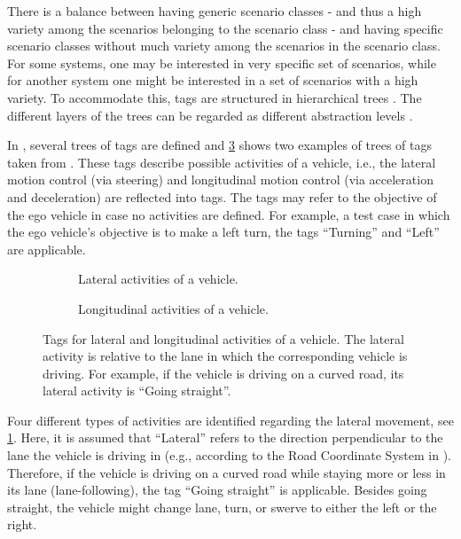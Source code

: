 There is a balance between having generic scenario classes - and thus a high variety among the scenarios belonging to the scenario class - and having specific scenario classes without much variety among the scenarios in the scenario class. For some systems, one may be interested in very specific set of scenarios, while for another system one might be interested in a set of scenarios with a high variety. To accommodate this, tags are structured in hierarchical trees \cite{molloy2017dynamic, badger2012dynamic}. The different layers of the trees can be regarded as different abstraction levels \cite{Bonnin2014}. 

In \cite{degelder2019scenarioclasses}, several trees of tags are defined and \cref{fig:tree vehicle activities} shows two examples of trees of tags taken from \cite{degelder2019scenarioclasses}. These tags describe possible activities of a vehicle, i.e., the lateral motion control (via steering) and longitudinal motion control (via acceleration and deceleration) are reflected into tags. The tags may refer to the objective of the ego vehicle in case no activities are defined. For example, a test case in which the ego vehicle's objective is to make a left turn, the tags ``Turning'' and ``Left'' are applicable. 

\begin{figure}
	\centering
	\begin{subfigure}{\linewidth}
		\centering
		\caption{Lateral activities of a vehicle.}
		\label{fig:tree vehicle lat act}
	\end{subfigure}
	\begin{subfigure}{\linewidth}
		\centering
		\caption{Longitudinal activities of a vehicle.}
		\label{fig:tree vehicle long act}
	\end{subfigure}
	\caption{Tags for lateral and longitudinal activities of a vehicle. The lateral activity is relative to the lane in which the corresponding vehicle is driving. For example, if the vehicle is driving on a curved road, its lateral activity is ``Going straight''.}
	\label{fig:tree vehicle activities}
\end{figure}

Four different types of activities are identified regarding the lateral movement, see \cref{fig:tree vehicle lat act}. Here, it is assumed that ``Lateral'' refers to the direction perpendicular to the lane the vehicle is driving in (e.g., according to the Road Coordinate System in \cite{zofka2015datadrivetrafficscenarios}). Therefore, if the vehicle is driving on a curved road while staying more or less in its lane (lane-following), the tag ``Going straight'' is applicable. Besides going straight, the vehicle might change lane, turn, or swerve to either the left or the right.

